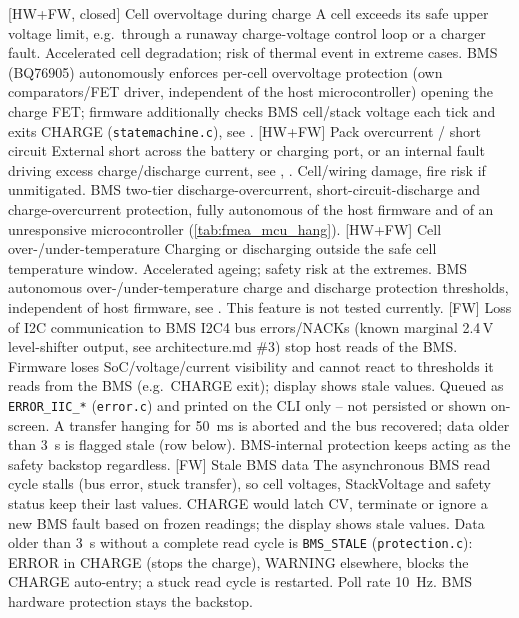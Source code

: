     \begin{FMEATable}
    \FMEAItemMinor
        {[HW+FW, closed] Cell overvoltage during charge}
        {A cell exceeds its safe upper voltage limit, e.g.\ through a runaway charge-voltage control loop or a charger fault.}
        {Accelerated cell degradation; risk of thermal event in extreme cases.}
        {\ac{BMS} (BQ76905) autonomously enforces per-cell overvoltage protection (own comparators/FET driver, independent of the host microcontroller) opening the charge \ac{FET}; firmware additionally checks BMS cell/stack voltage each tick and exits CHARGE (\texttt{statemachine.c}), see .}
    \FMEAItemMinor
        {[HW+FW] Pack overcurrent / short circuit}
        {External short across the battery or charging port, or an internal fault driving excess charge/discharge current, see , .}
        {Cell/wiring damage, fire risk if unmitigated.}
        {\ac{BMS} two-tier discharge-overcurrent, short-circuit-discharge and charge-overcurrent protection, fully autonomous of the host firmware and of an unresponsive microcontroller (\autoref{tab:fmea_mcu_hang}).}
    \FMEAItemCritical
        {[HW+FW] Cell over-/under-temperature}
        {Charging or discharging outside the safe cell temperature window.}
        {Accelerated ageing; safety risk at the extremes.}
        {\ac{BMS} autonomous over-/under-temperature charge and discharge protection thresholds, independent of host firmware, see . This feature is not tested currently.}
    \FMEAItemModerate
        {[FW] Loss of \acs{I2C} communication to \acs{BMS}}
        {I2C4 bus errors/NACKs (known marginal 2.4\,V level-shifter output, see architecture.md \#3) stop host reads of the \ac{BMS}.}
        {Firmware loses SoC/voltage/current visibility and cannot react to thresholds it reads from the \ac{BMS} (e.g.\ CHARGE exit); display shows stale values.}
        {Queued as \texttt{ERROR\_IIC\_*} (\texttt{error.c}) and printed on the \ac{CLI} only -- not persisted or shown on-screen. A transfer hanging for \qty{50}{\milli\second} is aborted and the bus recovered; data older than \qty{3}{\second} is flagged stale (row below). \ac{BMS}-internal protection keeps acting as the safety backstop regardless.}
    \FMEAItemModerate
        {[FW] Stale \acs{BMS} data}
        {The asynchronous \ac{BMS} read cycle stalls (bus error, stuck transfer), so cell voltages, StackVoltage and safety status keep their last values.}
        {CHARGE would latch CV, terminate or ignore a new \ac{BMS} fault based on frozen readings; the display shows stale values.}
        {Data older than \qty{3}{\second} without a complete read cycle is \texttt{BMS\_STALE} (\texttt{protection.c}): ERROR in CHARGE (stops the charge), WARNING elsewhere, blocks the CHARGE auto-entry; a stuck read cycle is restarted. Poll rate \qty{10}{\hertz}. \ac{BMS} hardware protection stays the backstop. }
    \caption{FMEA -- Battery and BMS} \\
    \end{FMEATable}

